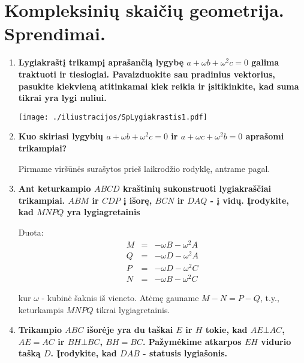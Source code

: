 





\section{Kompleksinių skaičių geometrija. Sprendimai.} 


\begin{enumerate}
 
\item \textbf{ Lygiakraštį trikampį aprašančią lygybę $a + \omega b + \omega^2 c = 0$ galima traktuoti ir tiesiogiai. Pavaizduokite sau pradinius vektorius, pasukite kiekvieną atitinkamai kiek reikia ir įsitikinkite, kad suma tikrai yra lygi nuliui.} 
\medskip

  \texttt{[image: ./iliustracijos/SpLygiakrastis1.pdf]}
\medskip
\item \textbf{ Kuo skiriasi lygybių $a+\omega b + \omega^2 c = 0$ ir $a + \omega c + \omega^2 b = 0$ aprašomi trikampiai?}
\medskip

Pirmame viršūnės surašytos prieš laikrodžio rodyklę, antrame pagal.
\medskip

\item \textbf{ Ant keturkampio $ABCD$ kraštinių sukonstruoti lygiakraščiai trikampiai. $ABM$ ir $CDP$ į išorę, $BCN$ ir $DAQ$ - į vidų. Įrodykite, kad $MNPQ$ yra lygiagretainis}
\medskip

Duota: 
\begin{eqnarray*}
M&=&-\omega B - \omega ^2 A \\
Q&=&-\omega D - \omega ^2 A \\
P&=&-\omega D - \omega ^2 C \\
N&=&-\omega B - \omega ^2 C 
\end{eqnarray*}

kur $\omega$ - kubinė šaknis iš vieneto. Atėmę gauname $M - N = P - Q$, t.y., keturkampis $MNPQ$ tikrai lygiagretainis. 
\medskip

\item \textbf{ Trikampio $ABC$ išorėje yra du taškai $E$ ir $H$ tokie, kad $AE \bot AC$, $AE=AC$ ir $BH\bot BC$, $BH = BC$. Pažymėkime atkarpos $EH$ vidurio tašką $D$. Įrodykite, kad $DAB$ - statusis lygiašonis. }
\medskip


\end{enumerate}
